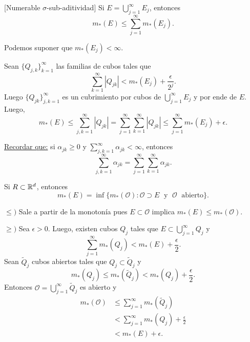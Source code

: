     \begin{observacion}{}[Numerable $\sigma$-sub-aditividad]\label{obs:sigma-subaditividad}
    Si $E=\bigcup\limits_{j=1}^{\infty} E_j$, entonces 
    \[m_{*}(E)\leq \sum\limits_{j=1}^{\infty} m_{*}(E_j).\]
    \begin{demo}
    Podemos suponer que $m_{*}(E_j)<\infty$.
    
    Sean  $\{Q_{j,k}\}_{k=1}^{\infty}$ las familias de cubos tales que 
    \[
    \sum\limits_{k=1}^{\infty} |Q_{jk}|<m_{*}(E_j)+\frac{\epsilon}{2^j}.
    \]
    Luego $\{Q_{jk}\}_{j, k=1}^{\infty}$ es un cubrimiento por cubos de $\bigcup\limits_{j=1}^{\infty} E_j$
    y por ende de $E$. 
    Luego, 
    \[
    m_{*}(E)\leq \sum\limits_{j,k=1}^{\infty} |Q_{jk}|=
    \sum\limits_{j=1}^{\infty} \sum\limits_{k=1}^{\infty} |Q_{jk}|
    \leq \sum\limits_{j=1}^{\infty} m_{*}(E_j)+\epsilon.
    \]
       \end{demo}
        \underline{Recordar que:} si $\alpha_{jk}\geq 0$ y $\sum\limits_{j,k=1}^{\infty} \alpha_{jk}<\infty$, entonces
    \[
    \sum\limits_{j,k=1}^{\infty} \alpha_{jk}=
    \sum\limits_{j=1}^{\infty} \sum\limits_{k=1}^{\infty}\alpha_{jk}.
    \]
    \end{observacion}
    
    \begin{observacion}{}\label{obs:def-medida-ext-abierto}
    Si $R\subset \mathbb{R}^d$, entonces
    \[
    m_{*}(E)=
    \inf\{
    m_{*}(\mathcal{O}): \mathcal{O}\supset E\;\mbox{ y }\;\mathcal{O}\;\mbox{ abierto} 
    \}.
    \]
    
    \begin{demo}
    $\leq)$
    Sale a partir de la monoton\'ia pues $E \subset \mathscr{O}$ implica $m_{*}(E)\leq m_{*}(\mathscr{O})$.
    
    $\geq)$
    Sea $\epsilon>0$. Luego, existen cubos  $Q_j$  tales que $E\subset \bigcup\limits_{j=1}^{\infty}Q_j$ y 
    \[
    \sum\limits_{j=1}^{\infty} m_{*}(Q_j)< m_{*}(E)+\frac{\epsilon}{2}.
    \]
    Sean $\widetilde{Q}_j$ cubos abiertos tales que $Q_j \subset \widetilde{Q}_j$ y 
    \[
    m_{*}(Q_j)\leq m_{*}(\widetilde{Q}_j)<m_{*}(Q_j)+\frac{\epsilon}{2}.
    \]
    Entonces 
    $\mathcal{O}=\bigcup\limits_{j=1}^{\infty} \widetilde{Q}_j$         es abierto y 
        \[
        \begin{split}
        m_{*}(\mathscr{O})
        &\leq \sum\limits_{j=1}^{\infty}m_{*}(\widetilde{Q}_j)
        \\
        &<  \sum\limits_{j=1}^{\infty} m_{*}(Q_j)+\frac{\epsilon}{2}
        \\
        &<m_{*}(E)+\epsilon.
        \end{split}
        \]
    \end{demo}
    \end{observacion}
    
